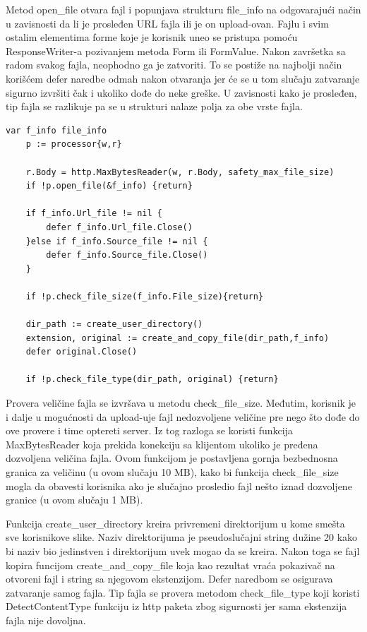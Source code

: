 \documentclass[12pt,oneside]{memoir}
\begin{document}
Metod open\_file otvara fajl i popunjava strukturu file\_info na odgovarajući način u zavisnosti da li je prosleđen URL fajla ili je on upload-ovan. Fajlu i svim ostalim elementima forme koje je korisnik uneo se pristupa pomoću ResponseWriter-a pozivanjem metoda Form ili FormValue. Nakon završetka sa radom svakog fajla, neophodno ga je zatvoriti. To se postiže na najbolji način korišćem defer naredbe odmah nakon otvaranja jer će se u tom slučaju zatvaranje sigurno izvršiti čak i ukoliko dođe do neke greške. U zavisnosti kako je prosleđen, tip fajla se razlikuje pa se u strukturi nalaze polja za obe vrste fajla. 

\newpage

\begin{center}
\begin{lstlisting}[caption=Otvaranje i provera fajla u funkciji ImageHandler,label={lst:open},float,  backgroundcolor=\color{background},belowskip=-0.8 \baselineskip]
	var f_info file_info
	p := processor{w,r}

	r.Body = http.MaxBytesReader(w, r.Body, safety_max_file_size)
	if !p.open_file(&f_info) {return}

	if f_info.Url_file != nil {
		defer f_info.Url_file.Close()
	}else if f_info.Source_file != nil {
		defer f_info.Source_file.Close()
	}

	if !p.check_file_size(f_info.File_size){return}

	dir_path := create_user_directory()
	extension, original := create_and_copy_file(dir_path,f_info)
	defer original.Close()

	if !p.check_file_type(dir_path, original) {return}
\end{lstlisting}
\end{center}

Provera veličine fajla se izvršava u metodu check\_file\_size. Međutim, korisnik je i dalje u mogućnosti da upload-uje fajl nedozvoljene veličine pre nego što dođe do ove provere i time optereti server. Iz tog razloga se koristi funkcija MaxBytesReader koja prekida konekciju sa klijentom ukoliko je pređena dozvoljena veličina fajla. Ovom funkcijom je postavljena gornja bezbednosna granica za veličinu (u ovom slučaju 10 MB), kako bi funkcija check\_file\_size mogla da obavesti korisnika ako je slučajno prosledio fajl nešto iznad dozvoljene granice (u ovom slučaju 1 MB). 

Funkcija create\_user\_directory kreira privremeni direktorijum u kome smešta sve korisnikove slike. Naziv direktorijuma je pseudoslučajni string dužine 20 kako bi naziv bio jedinstven i direktorijum uvek mogao da se kreira. Nakon toga se fajl kopira funcijom create\_and\_copy\_file koja kao rezultat vraća pokazivač na otvoreni fajl i string sa njegovom ekstenzijom. Defer naredbom se osigurava zatvaranje samog fajla. Tip fajla se provera metodom  check\_file\_type koji koristi DetectContentType funkciju iz http paketa zbog sigurnosti jer sama ekstenzija fajla nije dovoljna.
 
\end{document}
